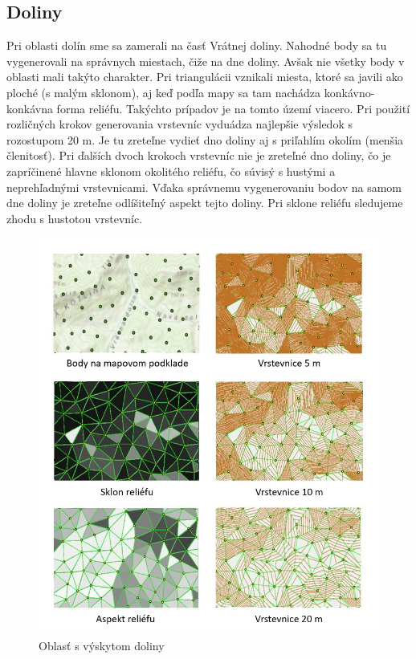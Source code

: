 \documentclass[12pt]{article}
\begin{document}
\subsection*{Doliny}
Pri oblasti dolín sme sa zamerali na časť Vrátnej doliny. Nahodné body sa tu vygenerovali na správnych miestach, čiže na dne doliny. Avšak nie všetky body v oblasti mali takýto charakter. Pri triangulácii vznikali miesta, ktoré sa javili ako ploché (s malým sklonom), aj keď podľa mapy sa tam nachádza konkávno-konkávna forma reliéfu. Takýchto prípadov je na tomto území viacero. Pri použití rozličných krokov generovania vrstevníc vyduádza najlepšie výsledok s rozostupom 20 m. Je tu zreteľne vydieť dno doliny aj s priľahlím okolím (menšia členitosť). Pri ďalších dvoch krokoch vrstevníc nie je zreteľné dno doliny, čo je zapríčinené hlavne sklonom okolitého reliéfu, čo súvisý s hustými a neprehľadnými vrstevnicami. Vďaka správnemu vygenerovaniu bodov na samom dne doliny je zreteľne odlíšiteľný aspekt tejto doliny. Pri sklone reliéfu sledujeme zhodu s hustotou vrstevníc. 

\begin{figure}[h]
    \centering
    \includegraphics[width=0.6\linewidth]{latex/images/dolina.jpg}
    \caption{Oblasť s výskytom doliny}
    \label{fig:enter-label}
\end{figure}
\end{document}
